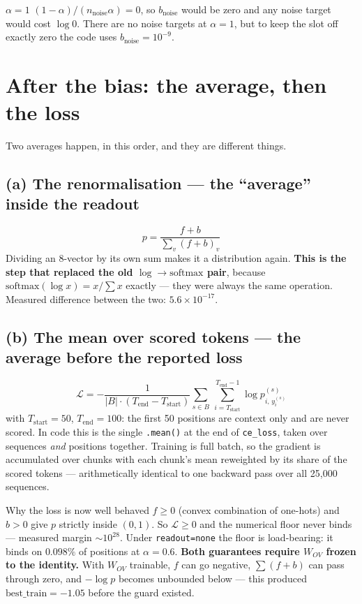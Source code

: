 \documentclass[11pt]{article}
\newcommand{\Wov}{W_{OV}}
\newcommand{\nnoise}{n_{\mathrm{noise}}}
\newcommand{\bnoise}{b_{\mathrm{noise}}}
\begin{document}
\begin{notebox}{$\alpha=1$}
$(1-\alpha)/(\nnoise\alpha)=0$, so $\bnoise$ would be zero and any noise target would cost
$\log 0$. There are no noise targets at $\alpha=1$, but to keep the slot off exactly zero the code
uses $\bnoise=10^{-9}$.
\end{notebox}

\section{After the bias: the average, then the loss}

Two averages happen, in this order, and they are different things.

\subsection{(a) The renormalisation --- the ``average'' inside the readout}
\[
p=\frac{f+b}{\sum_v (f+b)_v}
\]
Dividing an 8-vector by its own sum makes it a distribution again. \textbf{This is the step that
replaced the old $\log\to\text{softmax}$ pair}, because
$\mathrm{softmax}(\log x)=x/\!\sum x$ exactly --- they were always the same operation. Measured
difference between the two: $5.6\times10^{-17}$.

\subsection{(b) The mean over scored tokens --- the average before the reported loss}
\[
\mathcal{L}=-\frac{1}{|B|\cdot(T_{\text{end}}-T_{\text{start}})}
\sum_{s\in B}\ \sum_{i=T_{\text{start}}}^{T_{\text{end}}-1}\log p^{(s)}_{i,\,y^{(s)}_i}
\]
with $T_{\text{start}}=50$, $T_{\text{end}}=100$: the first 50 positions are context only and are
never scored. In code this is the single \texttt{.mean()} at the end of \texttt{ce\_loss}, taken
over sequences \emph{and} positions together. Training is full batch, so the gradient is
accumulated over chunks with each chunk's mean reweighted by its share of the scored tokens ---
arithmetically identical to one backward pass over all 25{,}000 sequences.

\begin{notebox}{Why the loss is now well behaved}
$f\ge0$ (convex combination of one-hots) and $b>0$ give $p$ strictly inside $(0,1)$. So
$\mathcal{L}\ge0$ and the numerical floor never binds --- measured margin $\sim10^{28}$. Under
\texttt{readout=none} the floor is load-bearing: it binds on $0.098\%$ of positions at
$\alpha=0.6$. \textbf{Both guarantees require $\Wov$ frozen to the identity.} With $\Wov$
trainable, $f$ can go negative, $\sum(f+b)$ can pass through zero, and $-\log p$ becomes unbounded
below --- this produced $\text{best\_train}=-1.05$ before the guard existed.
\end{notebox}
\end{document}
